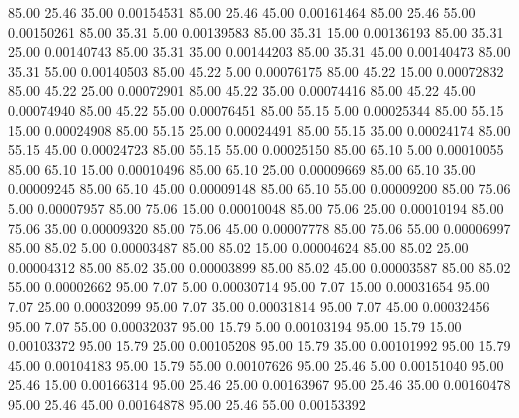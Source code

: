      85.00     25.46     35.00     0.00154531
     85.00     25.46     45.00     0.00161464
     85.00     25.46     55.00     0.00150261
     85.00     35.31      5.00     0.00139583
     85.00     35.31     15.00     0.00136193
     85.00     35.31     25.00     0.00140743
     85.00     35.31     35.00     0.00144203
     85.00     35.31     45.00     0.00140473
     85.00     35.31     55.00     0.00140503
     85.00     45.22      5.00     0.00076175
     85.00     45.22     15.00     0.00072832
     85.00     45.22     25.00     0.00072901
     85.00     45.22     35.00     0.00074416
     85.00     45.22     45.00     0.00074940
     85.00     45.22     55.00     0.00076451
     85.00     55.15      5.00     0.00025344
     85.00     55.15     15.00     0.00024908
     85.00     55.15     25.00     0.00024491
     85.00     55.15     35.00     0.00024174
     85.00     55.15     45.00     0.00024723
     85.00     55.15     55.00     0.00025150
     85.00     65.10      5.00     0.00010055
     85.00     65.10     15.00     0.00010496
     85.00     65.10     25.00     0.00009669
     85.00     65.10     35.00     0.00009245
     85.00     65.10     45.00     0.00009148
     85.00     65.10     55.00     0.00009200
     85.00     75.06      5.00     0.00007957
     85.00     75.06     15.00     0.00010048
     85.00     75.06     25.00     0.00010194
     85.00     75.06     35.00     0.00009320
     85.00     75.06     45.00     0.00007778
     85.00     75.06     55.00     0.00006997
     85.00     85.02      5.00     0.00003487
     85.00     85.02     15.00     0.00004624
     85.00     85.02     25.00     0.00004312
     85.00     85.02     35.00     0.00003899
     85.00     85.02     45.00     0.00003587
     85.00     85.02     55.00     0.00002662
     95.00      7.07      5.00     0.00030714
     95.00      7.07     15.00     0.00031654
     95.00      7.07     25.00     0.00032099
     95.00      7.07     35.00     0.00031814
     95.00      7.07     45.00     0.00032456
     95.00      7.07     55.00     0.00032037
     95.00     15.79      5.00     0.00103194
     95.00     15.79     15.00     0.00103372
     95.00     15.79     25.00     0.00105208
     95.00     15.79     35.00     0.00101992
     95.00     15.79     45.00     0.00104183
     95.00     15.79     55.00     0.00107626
     95.00     25.46      5.00     0.00151040
     95.00     25.46     15.00     0.00166314
     95.00     25.46     25.00     0.00163967
     95.00     25.46     35.00     0.00160478
     95.00     25.46     45.00     0.00164878
     95.00     25.46     55.00     0.00153392
